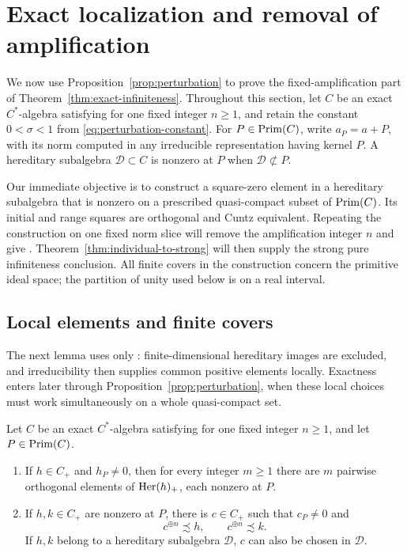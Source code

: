 \section{Exact localization and removal of amplification}
\label{sec:localization}

We now use Proposition~\ref{prop:perturbation} to prove the fixed-amplification
part of Theorem~\ref{thm:exact-infiniteness}.  Throughout this section,
let $C$ be an exact $C^*$-algebra satisfying \propF{} for one fixed
integer $n\geq1$, and retain the constant $0<\sigma<1$ from
\eqref{eq:perturbation-constant}.  For $P\in\operatorname{Prim}(C)$, write
$a_P=a+P$, with its norm computed in any irreducible representation
having kernel $P$.  A hereditary subalgebra $\mathcal D\subset C$
is nonzero at $P$ when $\mathcal D\not\subset P$.

Our immediate objective is to construct a square-zero element in a
hereditary subalgebra that is nonzero on a prescribed quasi-compact
subset of $\operatorname{Prim}(C)$.  Its initial and range squares are orthogonal
and Cuntz equivalent.  Repeating the construction on one fixed norm
slice will remove the amplification integer $n$ and give \propP{}.
Theorem~\ref{thm:individual-to-strong} will then supply the strong
pure infiniteness conclusion.  All finite covers in the construction
concern the primitive ideal space; the partition of unity used below
is on a real interval.

\subsection{Local elements and finite covers}

The next lemma uses only \propF{}: finite-dimensional hereditary
images are excluded, and irreducibility then supplies common positive
elements locally.  Exactness enters later through
Proposition~\ref{prop:perturbation}, when these local choices must
work simultaneously on a whole quasi-compact set.

\begin{lemma}\label{lem:local-common-element}
Let $C$ be an exact $C^*$-algebra satisfying \propF{} for one fixed
integer $n\geq1$, and let $P\in\operatorname{Prim}(C)$.
\begin{enumerate}[label=\textup{(\roman*)}]
\item If $h\in C_+$ and $h_P\ne0$, then for every integer $m\ge1$
there are $m$ pairwise orthogonal elements of $\operatorname{Her}(h)_+$, each
nonzero at $P$.
\item If $h,k\in C_+$ are nonzero at $P$, there is $c\in C_+$
such that $c_P\ne0$ and
\[
 c^{\oplus n}\precsim h,\qquad c^{\oplus n}\precsim k.
\]
If $h,k$ belong to a hereditary subalgebra $\mathcal D$, $c$ can also
be chosen in $\mathcal D$.
\end{enumerate}
\end{lemma}

